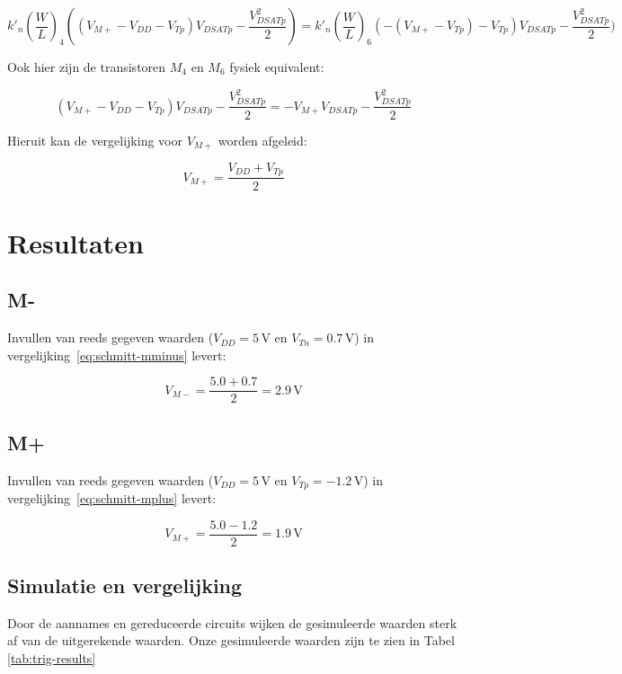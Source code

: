 \documentclass{scrartcl}  %
\begin{document}
$$k'_{n}(\frac{W}{L})_{4}((V_{M+}-V_{DD}-V_{Tp})V_{DSATp} - \frac{V^{2}_{DSATp}}{2}) = k'_{n}(\frac{W}{L})_{6}(-(V_{M+}-V_{Tp})-V_{Tp})V_{DSATp} - \frac{V^{2}_{DSATp}}{2})$$

Ook hier zijn de transistoren $M_{4}$ en $M_{6}$ fysiek equivalent:

$$(V_{M+}-V_{DD}-V_{Tp})V_{DSATp} - \frac{V^{2}_{DSATp}}{2} = -V_{M+}V_{DSATp} - \frac{V^{2}_{DSATp}}{2}$$

Hieruit kan de vergelijking voor $V_{M+}$ worden afgeleid:

\begin{equation} \label{eq:schmitt-mplus}
V_{M+} = \frac{V_{DD}+V_{Tp}}{2}
\end{equation}

\section{Resultaten}
\label{sec:trig-res}
\subsection{M-}
\label{subsec:trig-res-mminus}
Invullen van reeds gegeven waarden ($V_{DD} = 5 \,\textrm{V}$ en $V_{Tn} = 0.7 \,\textrm{V}$) in vergelijking~\ref{eq:schmitt-mminus} levert:

\begin{equation} \label{eq:schmitt-mminus-val}
V_{M-} = \frac{5.0+0.7}{2} = 2.9 \,\textrm{V}
\end{equation}

\subsection{M+}
\label{subsec:trig-res-mplus}
Invullen van reeds gegeven waarden ($V_{DD} = 5 \,\textrm{V}$ en $V_{Tp} = -1.2 \,\textrm{V}$) in vergelijking~\ref{eq:schmitt-mplus} levert:

\begin{equation} \label{eq:schmitt-mplus-val}
V_{M+} = \frac{5.0-1.2}{2} = 1.9 \,\textrm{V}
\end{equation}

\subsection{Simulatie en vergelijking}
\label{subsec:trig-res-verg}
Door de aannames en gereduceerde circuits wijken de gesimuleerde waarden sterk af van de uitgerekende waarden. Onze gesimuleerde waarden zijn te zien in Tabel \ref{tab:trig-results}
\end{document}
